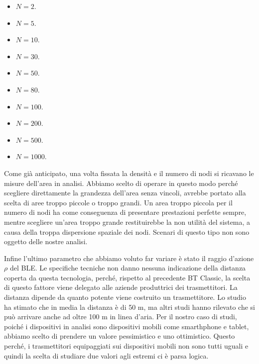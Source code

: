\begin{itemize}
	\item $ N = 2 $.
	\item $ N = 5 $.
	\item $ N = 10 $.
	\item $ N = 30 $.
	\item $ N = 50 $.
	\item $ N = 80 $.
	\item $ N = 100 $.
	\item $ N = 200 $.
	\item $ N = 500 $.
	\item $ N = 1000 $.
\end{itemize}
Come già anticipato, una volta fissata la densità e il numero di nodi si ricavano le misure dell'area in analisi. Abbiamo scelto di operare in questo modo perché scegliere direttamente la grandezza dell'area senza vincoli, avrebbe portato alla scelta di aree troppo piccole o troppo grandi. Un area troppo piccola per il numero di nodi ha come conseguenza di presentare prestazioni perfette sempre, mentre scegliere un'area troppo grande restituirebbe la non utilità del sistema, a causa della troppa dispersione spaziale dei nodi. Scenari di questo tipo non sono oggetto delle nostre analisi.

Infine l'ultimo parametro che abbiamo voluto far variare è stato il raggio d'azione $\rho$ del BLE. Le specifiche tecniche non danno nessuna indicazione della distanza coperta da questa tecnologia, perché, rispetto al precedente BT Classic, la scelta di questo fattore viene delegato alle aziende produttrici dei trasmettitori. La distanza dipende da quanto potente viene costruito un trasmettitore.
Lo studio \cite{tesi_tibertoa2013} ha stimato che in media la distanza è di 50 m, ma altri studi hanno rilevato che si può arrivare anche ad oltre 100 m in linea d'aria. Per il nostro caso di studi, poiché i dispositivi in analisi sono dispositivi mobili come smarthphone e tablet, abbiamo scelto di prendere un valore pessimistico e uno ottimistico. Questo perché, i trasmettitori equipaggiati sui dispositivi mobili non sono tutti uguali e quindi la scelta di studiare due valori agli estremi ci è parsa logica.
\medskip

